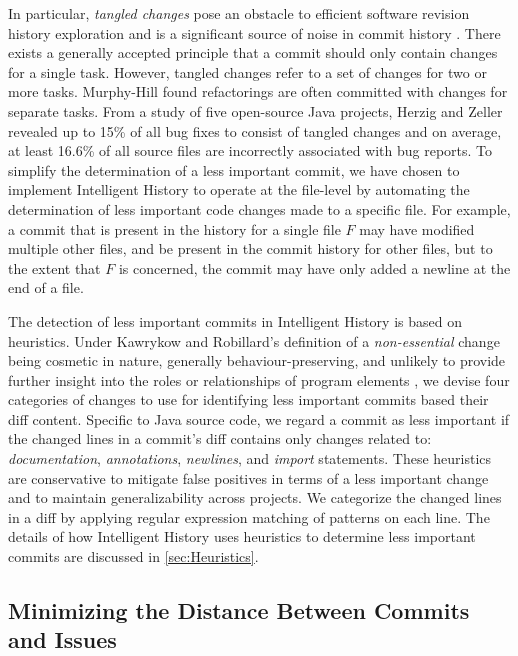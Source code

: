 In particular, \emph{tangled changes} pose an obstacle to efficient software revision history exploration and is a significant source of noise in commit history \cite{herzig_tangled_2013}.
There exists a generally accepted principle that a commit should only contain changes for a single task.
However, tangled changes refer to a set of changes for two or more tasks. 
Murphy-Hill \etal \cite{murphy-hill_refactor_2012} found refactorings are often committed with changes for separate tasks. 
From a study of five open-source Java projects, Herzig and Zeller \cite{herzig_tangled_2013} revealed up to 15\% of all bug fixes to consist of tangled changes and on average, at least 16.6\% of all source files are incorrectly associated with bug reports. 
To simplify the determination of a less important commit, we have chosen to implement Intelligent History to operate at the file-level by automating the determination of less important code changes made to a specific file. 
For example, a commit that is present in the history for a single file $F$ may have modified multiple other files, and be present in the commit history for other files, but to the extent that $F$ is concerned, the commit may have only added a newline at the end of a file.

The detection of less important commits in Intelligent History is based on heuristics.
Under Kawrykow and Robillard's definition of a \emph{non-essential} change being cosmetic in nature, generally behaviour-preserving, and unlikely to provide further insight into the roles or relationships of program elements \cite{kawrykow_non-essential_2011}, we devise four categories of changes to use for identifying less important commits based their diff content.
Specific to Java source code, we regard a commit as less important if the changed lines in a commit's diff contains only changes related to: \emph{documentation}, \emph{annotations}, \emph{newlines}, and \emph{import} statements.
These heuristics are conservative to mitigate false positives in terms of a less important change and to maintain generalizability across projects.
We categorize the changed lines in a diff by applying regular expression matching of patterns on each line.
The details of how Intelligent History uses heuristics to determine less important commits are discussed in \autoref{sec:Heuristics}.

\subsection{Minimizing the Distance Between Commits and Issues}
\label{subsec:Minimize-Commit-Issue-Distance}

